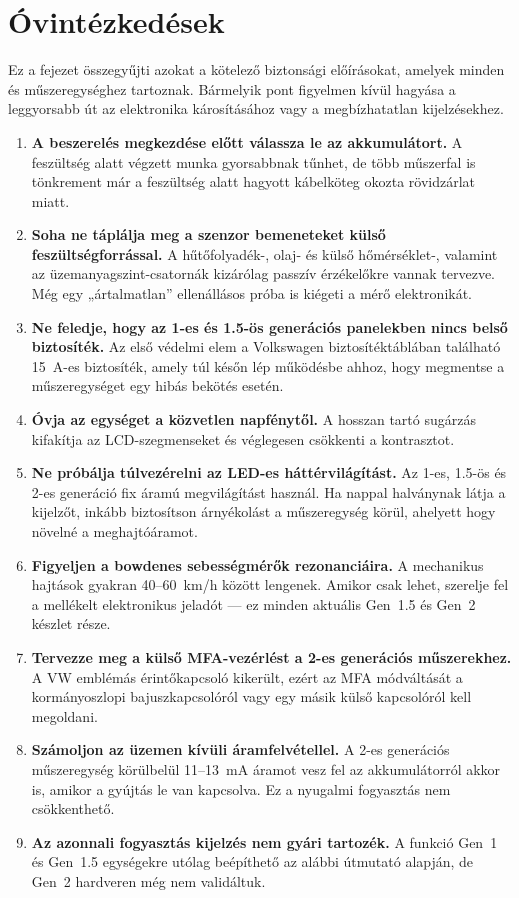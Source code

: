 \chapter{Óvintézkedések}\label{ch:precautions}

Ez a fejezet összegyűjti azokat a kötelező biztonsági előírásokat, amelyek minden \ReplicaGenOne{} és \ReplicaNextLong{} műszeregységhez tartoznak. Bármelyik pont figyelmen kívül hagyása a leggyorsabb út az elektronika károsításához vagy a megbízhatatlan kijelzésekhez.

\begin{enumerate}
    \item \textbf{A beszerelés megkezdése előtt válassza le az akkumulátort.} A feszültség alatt végzett munka gyorsabbnak tűnhet, de több műszerfal is tönkrement már a feszültség alatt hagyott kábelköteg okozta rövidzárlat miatt.
    \item \textbf{Soha ne táplálja meg a szenzor bemeneteket külső feszültségforrással.} A hűtőfolyadék-, olaj- és külső hőmérséklet-, valamint az üzemanyagszint-csatornák kizárólag passzív érzékelőkre vannak tervezve. Még egy „ártalmatlan” ellenállásos próba is kiégeti a mérő elektronikát.
    \item \textbf{Ne feledje, hogy az 1-es és 1.5-ös generációs panelekben nincs belső biztosíték.} Az első védelmi elem a Volkswagen biztosítéktáblában található 15~A-es biztosíték, amely túl későn lép működésbe ahhoz, hogy megmentse a műszeregységet egy hibás bekötés esetén.
    \item \textbf{Óvja az egységet a közvetlen napfénytől.} A hosszan tartó sugárzás kifakítja az LCD-szegmenseket és véglegesen csökkenti a kontrasztot.
    \item \textbf{Ne próbálja túlvezérelni az LED-es háttérvilágítást.} Az 1-es, 1.5-ös és 2-es generáció fix áramú megvilágítást használ. Ha nappal halványnak látja a kijelzőt, inkább biztosítson árnyékolást a műszeregység körül, ahelyett hogy növelné a meghajtóáramot.
    \item \textbf{Figyeljen a bowdenes sebességmérők rezonanciáira.} A mechanikus hajtások gyakran 40--60~km/h között lengenek. Amikor csak lehet, szerelje fel a mellékelt elektronikus jeladót — ez minden aktuális Gen~1.5 és Gen~2 készlet része.
    \item \textbf{Tervezze meg a külső MFA-vezérlést a 2-es generációs műszerekhez.} A VW emblémás érintőkapcsoló kikerült, ezért az MFA módváltását a kormányoszlopi bajuszkapcsolóról vagy egy másik külső kapcsolóról kell megoldani.
    \item \textbf{Számoljon az üzemen kívüli áramfelvétellel.} A 2-es generációs műszeregység körülbelül 11--13~mA áramot vesz fel az akkumulátorról akkor is, amikor a gyújtás le van kapcsolva. Ez a nyugalmi fogyasztás nem csökkenthető.
    \item \textbf{Az azonnali fogyasztás kijelzés nem gyári tartozék.} A funkció Gen~1 és Gen~1.5 egységekre utólag beépíthető az alábbi útmutató alapján, de Gen~2 hardveren még nem validáltuk.
\end{enumerate}


